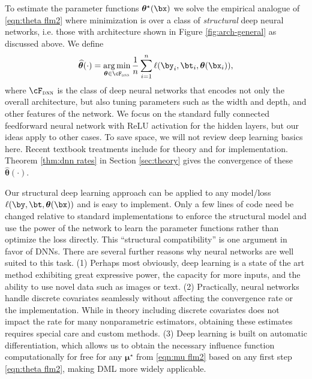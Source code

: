 \documentclass[12pt]{article}
\numberwithin{equation}{section}
\theoremstyle{definition}
\newcommand{\sumi}{\sum_{i=1}^n}
\DeclareMathOperator*{\argmin}{arg\,min}
\newcommand{\bmu}{\boldsymbol{\mu}}
\newcommand{\btheta}{\boldsymbol{\theta}}
\newcommand{\bmtrue}{\bmu^\star}
\newcommand{\bttrue}{\btheta^\star}
\newcommand{\bthat}{\bm{\widehat{\theta}}}
\begin{document}
To estimate the parameter functions $\bttrue(\bx)$ we solve the empirical analogue of \eqref{eqn:theta flm2} where minimization is over a class of \emph{structural} deep neural networks, i.e. those with architecture shown in Figure \ref{fig:arch-general} as discussed above. We define 
\begin{equation}
    \label{eqn:first stage}
    \bthat(\cdot) = \argmin_{\btheta \in \cF_{\textsc{dnn}}} \frac{1}{n} \sumi \ell(\by_i,\bt_i,\btheta(\bx_i)),
\end{equation}
where $\cF_{\textsc{dnn}}$ is the class of deep neural networks that encodes not only the overall architecture, but also tuning parameters such as the width and depth, and other features of the network. We focus on the standard fully connected feedforward neural network with ReLU activation for the hidden layers, but our ideas apply to other cases. To save space, we will not review deep learning basics here. Recent textbook treatments include \cite{Roberts-Yaida-Hanin2022_book} for theory and \cite{Keydana2023_book} for implementation. Theorem \ref{thm:dnn rates} in Section \ref{sec:theory} gives the convergence of these $\bthat(\cdot)$.


Our structural deep learning approach can be applied to any model/loss $\ell(\by, \bt, \btheta(\bx))$ and is easy to implement. Only a few lines of code need be changed relative to standard implementations to enforce the structural model and use the power of the network to learn the parameter functions rather than optimize the loss directly. This ``structural compatibility'' is one argument in favor of DNNs. There are several further reasons why neural networks are well suited to this task. (1) Perhaps most obviously, deep learning is a state of the art method exhibiting great expressive power, the capacity for more inputs, and the ability to use novel data such as images or text. (2) Practically, neural networks handle discrete covariates seamlessly without affecting the convergence rate or the implementation. While in theory including discrete covariates does not impact the rate for many nonparametric estimators, obtaining these estimates requires special care and custom methods. (3) Deep learning is built on automatic differentiation, which allows us to obtain the necessary influence function computationally for free for any $\bmtrue$ from \eqref{eqn:mu flm2} based on any first step \eqref{eqn:theta flm2}, making DML more widely applicable. 
\end{document}
